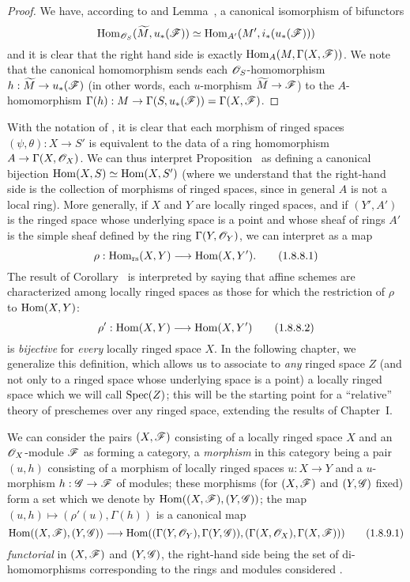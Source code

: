 \begin{proof}
We have, according to  and Lemma~, a canonical
isomorphism of bifunctors
\[
  \operatorname{Hom}_{\mathscr{O}_S}(\widetilde{M},u_*(\mathscr{F}))\simeq\operatorname{Hom}_{A'}(M',i_*(u_*(\mathscr{F})))
\]
and it is clear that the right hand side is exactly $\operatorname{Hom}_A(M,\Gamma(X,\mathscr{F}))$.
We note that the canonical homomorphism  sends each $\mathscr{O}_S$-homomorphism $h:\widetilde{M}\to u_*(\sh{F})$ (in other words, each $u$-morphism $\widetilde{M}\to\sh{F}$) to the $A$-homomorphism $\Gamma(h):M\to\Gamma(S,u_*(\sh{F}))=\Gamma(X,\sh{F})$.
\end{proof}

\begin{env}[1.8.8]
\label{I.1.8.8}
With the notation of , it is clear  that each morphism of ringed spaces $(\psi,\theta):X\to S'$ is equivalent to the data of a ring homomorphism $A\to\Gamma(X,\sh{O}_X)$.
We can thus interpret Proposition~ as defining a canonical bijection $\operatorname{Hom}(X,S)\simeq\operatorname{Hom}(X,S')$ (where we understand that the right-hand side is the collection of morphisms of ringed spaces, since in general $A$ is not a local ring).
More generally, if $X$ and $Y$ are locally ringed spaces, and if $(Y',A')$ is the ringed space whose underlying space is a point and whose sheaf of rings $A'$ is the simple sheaf defined by the ring $\Gamma(Y,\mathscr{O}_Y)$, we can interpret  as a map
\[
  \label{I.1.8.8.1}
  \rho:\Hom_\text{rs}(X,Y)\to\Hom(X,Y').
  \tag{1.8.8.1}
\]
The result of Corollary~ is interpreted by saying that affine schemes are characterized among locally ringed spaces as those for which the restriction of $\rho$ to
$\operatorname{Hom}(X,Y)$:
\[
  \label{I.1.8.8.2}
  \rho':\Hom(X,Y)\to\Hom(X,Y')
  \tag{1.8.8.2}
\]
is \emph{bijective} for \emph{every} locally ringed space $X$.
In the following chapter, we generalize this definition, which allows us to associate to \emph{any} ringed space $Z$ (and not only to a ringed space whose underlying space is a point) a locally ringed space which we will call $\operatorname{Spec}(Z)$;
this will be the starting point for a ``relative'' theory of preschemes over any ringed space, extending the results of Chapter~I.
\end{env}

\begin{env}[1.8.9]
\label{I.1.8.9}
We can consider the pairs $(X,\mathscr{F})$ consisting of a locally ringed space $X$ and an $\mathscr{O}_X$-module $\mathscr{F}$ as forming a category, a \emph{morphism} in this category being a pair $(u,h)$ consisting of a morphism of locally ringed spaces
$u:X\to Y$ and a $u$-morphism $h:\sh{G}\to\sh{F}$ of modules;
these morphisms (for $(X,\mathscr{F})$ and $(Y,\mathscr{G})$ fixed) form a set which we denote by $\operatorname{Hom}((X,\mathscr{F}),(Y,\mathscr{G}))$;
the map $(u,h)\mapsto(\rho'(u),\Gamma(h))$ is a canonical map
\[
  \label{I.1.8.9.1}
  \Hom((X,\sh{F}),(Y,\sh{G}))\to\Hom((\Gamma(Y,\sh{O}_Y),\Gamma(Y,\sh{G})),(\Gamma(X,\sh{O}_X),\Gamma(X,\sh{F})))
  \tag{1.8.9.1}
\]
\emph{functorial} in $(X,\mathscr{F})$ and $(Y,\mathscr{G})$, the right-hand side being the set of di-homomorphisms corresponding to the rings and modules considered .
\end{env}

